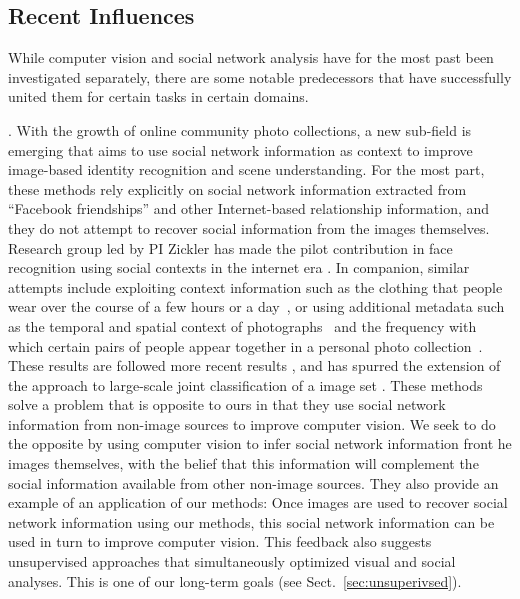 \subsection{Recent Influences}

While computer vision and social network analysis have for the most past been investigated separately, there are some notable predecessors that have successfully united them for certain tasks in certain domains.

. With the growth of online community photo collections, a new sub-field is emerging that aims to use social network information as context to improve image-based identity recognition and scene understanding. For the most part, these methods rely explicitly on social network information extracted from ``Facebook friendships'' and other Internet-based relationship information, and they do not attempt to recover social information from the images themselves. Research group led by PI Zickler has made the pilot contribution in face recognition using social contexts in the internet era \cite{Stone2008,Stone2010}. In companion, similar attempts include exploiting context information such as the clothing that people wear over the course of a few hours or a day~\cite{anguelov2007cir, zhang2003aah,  song2006cah, sivic2006fpr}, or using additional metadata such as the temporal and spatial context of photographs~\cite{naaman2005lcr, zhao2006apa} and the frequency with which certain pairs of people appear together in a personal photo collection~\cite{anguelov2007cir}. These results are followed more recent results \cite{Dikmen:classify,LeeBMVC2011,Poppe2012}, and has spurred the extension of the approach to large-scale joint classification of a image set \cite{McAuley:socialclassify}. These methods solve a problem that is opposite to ours in that they use social network information from non-image sources to improve computer vision. We seek to do the opposite by using computer vision to infer social network information front he images themselves, with the belief that this information will complement the social information available from other non-image sources. They also provide an example of an application of our methods: Once images are used to recover social network information using our methods, this social network information can be used in turn to improve computer vision. This feedback also suggests unsupervised approaches that simultaneously optimized visual and social analyses. This is one of our long-term goals (see Sect.~\ref{sec:unsuperivsed}).

